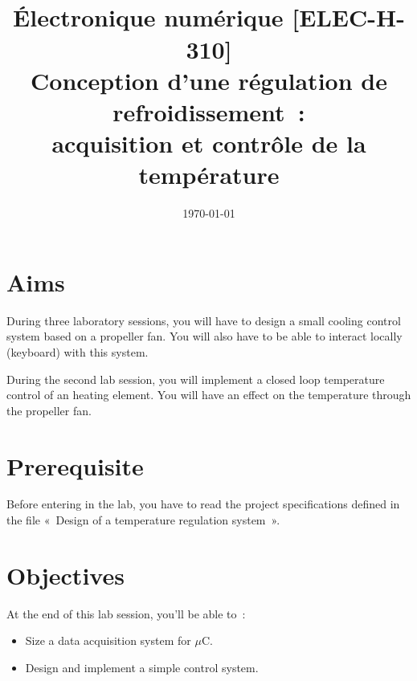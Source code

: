 \documentclass[11pt,a4paper]{article}
\date{\vspace{-1.7cm}\mydate\today}
\title{\vspace{-2cm}\labonumber\\ Électronique numérique [ELEC-H-310]\\Conception d'une régulation de refroidissement~: \\ acquisition et contrôle de la température\ifthenelse{\boolean{corrige}}{~\\Corrigé}{}}
\theoremstyle{definition}%
\begin{document}
\pagestyle{empty}
\maketitle





\section*{Aims}
During three laboratory sessions, you will have to design a small cooling control system based on a propeller fan.
You will also have to be able to interact locally (keyboard) with this system.

During the second lab session, you will implement a closed loop temperature control of an heating element.
You will have an effect on the temperature through the propeller fan.

\section*{Prerequisite}
Before entering in the lab, you have to read the project specifications defined in the file «~Design of a temperature regulation system~».


\section*{Objectives}
At the end of this lab session, you'll be able to~:
\begin{itemize}
	\item Size a data acquisition system for $\mu$C.
	\item Design and implement a simple control system.
\end{itemize}


\newpage




\end{document}
